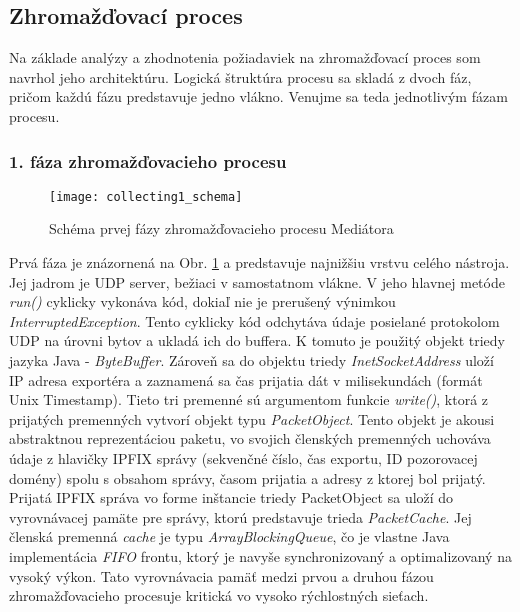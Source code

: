 
\subsection{Zhromažďovací proces} \label{sec:collectingprocess}

Na základe analýzy a zhodnotenia požiadaviek na zhromažďovací proces som navrhol jeho architektúru.
Logická štruktúra procesu sa skladá z dvoch fáz, pričom každú fázu predstavuje jedno vlákno. 
Venujme sa teda jednotlivým fázam procesu.

\subsubsection{1. fáza zhromažďovacieho procesu}

\begin{figure}[ht!]
\centering
\texttt{[image: collecting1\_schema]}
\caption{Schéma prvej fázy zhromažďovacieho procesu Mediátora}\label{o:collecting1_schema}
\end{figure}

Prvá fáza je znázornená na Obr. \ref{o:collecting1_schema} a predstavuje najnižšiu vrstvu celého 
nástroja. Jej jadrom je UDP server, bežiaci v samostatnom vlákne. V jeho hlavnej metóde \emph{run()}
cyklicky vykonáva kód, dokiaľ nie je prerušený výnimkou \emph{InterruptedException}.
Tento cyklicky kód odchytáva údaje posielané protokolom UDP na úrovni bytov a ukladá ich do 
buffera. K tomuto je použitý objekt triedy jazyka Java - \emph{ByteBuffer}. Zároveň sa do objektu 
triedy \emph{InetSocketAddress} uloží IP adresa exportéra a zaznamená sa čas prijatia dát v 
milisekundách (formát Unix Timestamp). Tieto tri premenné sú argumentom funkcie \emph{write()}, 
ktorá z prijatých premenných vytvorí objekt typu \emph{PacketObject}. Tento objekt je akousi
abstraktnou reprezentáciou paketu, vo svojich členských premenných uchováva údaje z hlavičky
IPFIX správy (sekvenčné číslo, čas exportu, ID pozorovacej domény) spolu s obsahom správy, časom 
prijatia a adresy z ktorej bol prijatý. 
Prijatá IPFIX správa vo forme inštancie triedy PacketObject 
sa uloží do vyrovnávacej pamäte pre správy, ktorú predstavuje trieda \emph{PacketCache}. Jej členská 
premenná \emph{cache} je typu \emph{ArrayBlockingQueue}, čo je vlastne Java implementácia \emph{FIFO}
frontu, ktorý je navyše synchronizovaný a optimalizovaný na vysoký výkon. Tato vyrovnávacia pamäť 
medzi prvou a druhou fázou zhromažďovacieho procesuje kritická vo vysoko rýchlostných sieťach. 

